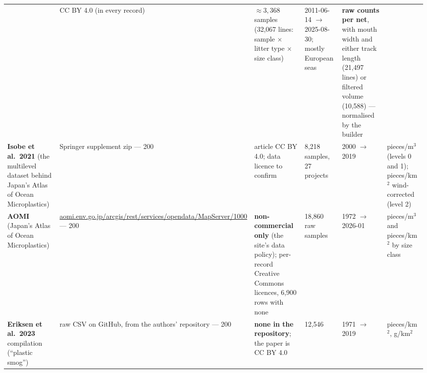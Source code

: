 \documentclass[10pt]{article}
\begin{document}
{\begin{longtable}{@{}L{3.0cm}L{3.4cm}L{2.1cm}L{2.6cm}L{1.8cm}L{2.5cm}@{}}
& CC BY 4.0 (in every record) & $\approx 3,368$ samples (32,067 lines: sample $\times$ litter type $\times$ size
class) & 2011-06-14 $\to$ 2025-08-30; mostly European seas & \textbf{raw counts per net}, with mouth width and
either track length (21,497 lines) or filtered volume (10,588) --- normalised by the builder \\
\addlinespace
\textbf{Isobe et al.\ 2021} (the multilevel dataset behind Japan's Atlas of Ocean Microplastics) & Springer
supplement zip --- 200 & article CC BY 4.0; data licence to confirm & 8,218 samples, 27 projects & 2000 $\to$ 2019 &
pieces/m$^3$ (levels 0 and 1); pieces/km$^2$ wind-corrected (level 2) \\
\addlinespace
\textbf{AOMI} (Japan's Atlas of Ocean Microplastics) & \url{aomi.env.go.jp/arcgis/rest/services/opendata/MapServer/1000}
--- 200 & \textbf{non-commercial only} (the site's data policy); per-record Creative Commons licences, 6,900 rows
with none & 18,860 raw samples & 1972 $\to$ 2026-01 & pieces/m$^3$ and pieces/km$^2$ by size class \\
\addlinespace
\textbf{Eriksen et al.\ 2023} compilation (``plastic smog'') & raw CSV on GitHub, from the authors' repository ---
200 & \textbf{none in the repository}; the paper is CC BY 4.0 & 12,546 & 1971 $\to$ 2019 & pieces/km$^2$,
g/km$^2$ \\
\bottomrule
\end{longtable}}
\end{document}
